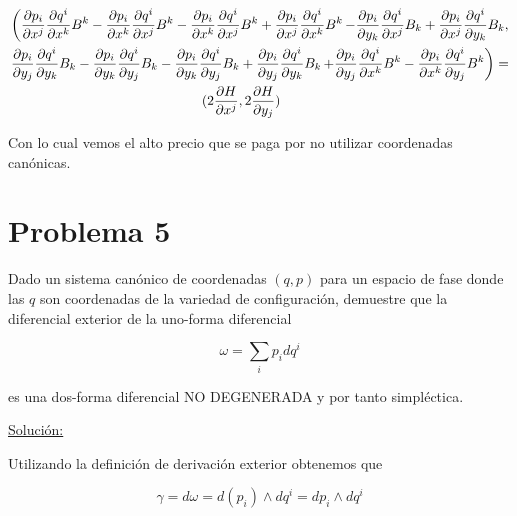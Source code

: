 \documentclass[a4paper,10pt]{article}
\numberwithin{equation}{section}
\newcommand{\zerodel}{.\kern-\nulldelimiterspace}
\begin{document}
\begin{align*}
 &\left(\frac{\partial p_i}{\partial x^j}\frac{\partial q^i}{\partial x^k}B^k
 - \frac{\partial p_i}{\partial x^k}\frac{\partial q^i}{\partial x^j}B^k
 - \frac{\partial p_i}{\partial x^k}\frac{\partial q^i}{\partial x^j}B^k
 + \frac{\partial p_i}{\partial x^j}\frac{\partial q^i}{\partial x^k}B^k\right\zerodel
 \left\zerodel-\frac{\partial p_i}{\partial y_k}\frac{\partial q^i}{\partial x^j}B_k
 +\frac{\partial p_i}{\partial x^j}\frac{\partial q^i}{\partial y_k}B_k,\right\zerodel \\
 &\left\zerodel \frac{\partial p_i}{\partial y_j}\frac{\partial q^i}{\partial y_k}B_k - 
  \frac{\partial p_i}{\partial y_k}\frac{\partial q^i}{\partial y_j}B_k
  - \frac{\partial p_i}{\partial y_k}\frac{\partial q^i}{\partial y_j}B_k 
  +\frac{\partial p_i}{\partial y_j}\frac{\partial q^i}{\partial y_k}B_k \right\zerodel 
  \left\zerodel + \frac{\partial p_i}{\partial y_j}\frac{\partial q^i}{\partial x^k}B^k
  - \frac{\partial p_i}{\partial x^k}\frac{\partial q^i}{\partial y_j}B^k\right) = \\ 
  &\hspace{5cm} (2\frac{\partial H}{\partial x^j}, 2\frac{\partial H}{\partial y_j})
\end{align*}

Con lo cual vemos el alto precio que se paga por no utilizar coordenadas canónicas.

\section{Problema 5}

Dado un sistema canónico de coordenadas $(q,p)$ para un espacio de fase donde las $q$ 
son coordenadas de la variedad de configuración, demuestre que la diferencial exterior 
de la uno-forma diferencial 

$$
\omega = \sum_i p_idq^i
$$

es una dos-forma diferencial NO DEGENERADA y por tanto simpléctica.

\vspace{.3cm}

\underline{Solución:} \vspace{.3cm}

Utilizando la definición de derivación exterior obtenemos que 

\begin{equation}
 \gamma = d\omega = d(p_i) \wedge dq^i = dp_i \wedge dq^i
\end{equation}
\end{document}
